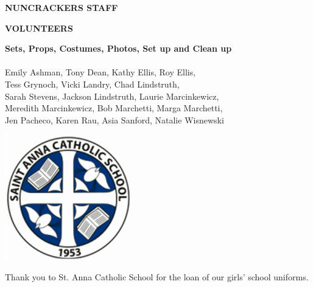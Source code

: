 \documentclass[12pt, a5paper, oneside]{article}
\begin{document}
\pagebreak
\begin{center}
\Large \textbf{NUNCRACKERS STAFF}
\end{center}
\raggedright
\begin{center}
    \Large\textbf{VOLUNTEERS}\\
\end{center}
\begin{center}
\textbf{Sets, Props, Costumes, Photos, Set up and Clean up}\\
\hfill\\
Emily Ashman, Tony Dean, Kathy Ellis, Roy Ellis, \\Tess Grynoch, Vicki Landry, Chad Lindstruth, \\Sarah Stevens, Jackson Lindstruth, Laurie Marcinkewicz, \\Meredith Marcinkewicz, Bob Marchetti, Marga Marchetti, \\Jen Pacheco, Karen Rau, Asia Sanford, Natalie Wisnewski
\end{center}
\begin{framed}
\begin{minipage}[c][0.25\textheight]{0.5\linewidth}
	\raggedright\includegraphics[scale=0.4]{media/st_anna_logo.png}
\end{minipage}
\raggedright
\begin{minipage}[0.25\textheight]{0.4\linewidth}
\raggedright Thank you to St. Anna Catholic School for the loan of our girls' school uniforms.	
\end{minipage}
\end{framed}
\end{document}
